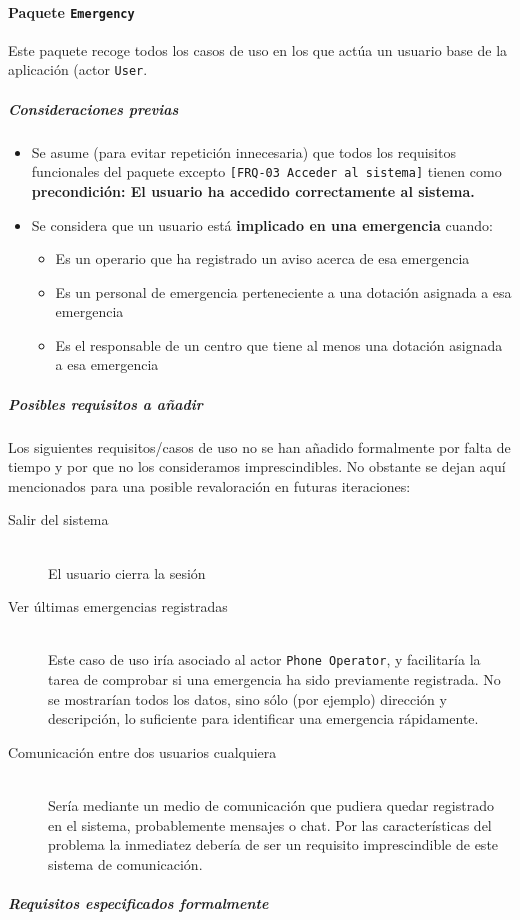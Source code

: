 \paragraph{Paquete \texttt{Emergency}}

Este paquete recoge todos los casos de uso en los que actúa un usuario base de la aplicación (actor \texttt{User}.
\par

\subparagraph{Consideraciones previas}
\begin{itemize}
    \item{Se asume (para evitar repetición innecesaria) que todos los requisitos funcionales del paquete excepto \texttt{[FRQ-03 Acceder al sistema]} tienen como \textbf{precondición: El usuario ha accedido correctamente al sistema.}}
    \item{Se considera que un usuario está \textbf{implicado en una emergencia} cuando:
        \begin{itemize}
            \item{Es un operario que ha registrado un aviso acerca de esa emergencia}
            \item{Es un personal de emergencia perteneciente a una dotación asignada a esa emergencia}
            \item{Es el responsable de un centro que tiene al menos una dotación asignada a esa emergencia}
        \end{itemize}
    }
\end{itemize}

\subparagraph{Posibles requisitos a añadir}

Los siguientes requisitos/casos de uso no se han añadido formalmente por falta de tiempo y por que no los consideramos imprescindibles. No obstante se dejan aquí mencionados para una posible revaloración en futuras iteraciones:
\begin{description}
    \item[Salir del sistema] \hfill \\
        El usuario cierra la sesión
    \item[Ver últimas emergencias registradas] \hfill \\
        Este caso de uso iría asociado al actor \texttt{Phone Operator}, y facilitaría la tarea de comprobar si una emergencia ha sido previamente registrada. No se mostrarían todos los datos, sino sólo (por ejemplo) dirección y descripción, lo suficiente para identificar una emergencia rápidamente.
    \item[Comunicación entre dos usuarios cualquiera] \hfill \\
        Sería mediante un medio de comunicación que pudiera quedar registrado en el sistema, probablemente mensajes o chat. Por las características del problema la inmediatez debería de ser un requisito imprescindible de este sistema de comunicación.
\end{description}

\subparagraph{Requisitos especificados formalmente}

